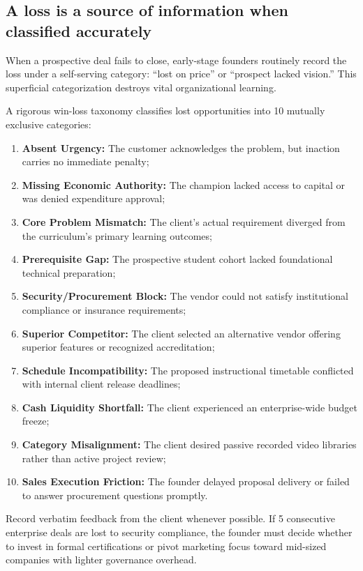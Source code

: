 \subsection{A loss is a source of information when classified accurately}

When a prospective deal fails to close, early-stage founders routinely record the loss under a self-serving category: ``lost on price'' or ``prospect lacked vision.'' This superficial categorization destroys vital organizational learning.

A rigorous win-loss taxonomy classifies lost opportunities into 10 mutually exclusive categories:
\begin{enumerate}
\item \textbf{Absent Urgency:} The customer acknowledges the problem, but inaction carries no immediate penalty;
\item \textbf{Missing Economic Authority:} The champion lacked access to capital or was denied expenditure approval;
\item \textbf{Core Problem Mismatch:} The client's actual requirement diverged from the curriculum's primary learning outcomes;
\item \textbf{Prerequisite Gap:} The prospective student cohort lacked foundational technical preparation;
\item \textbf{Security/Procurement Block:} The vendor could not satisfy institutional compliance or insurance requirements;
\item \textbf{Superior Competitor:} The client selected an alternative vendor offering superior features or recognized accreditation;
\item \textbf{Schedule Incompatibility:} The proposed instructional timetable conflicted with internal client release deadlines;
\item \textbf{Cash Liquidity Shortfall:} The client experienced an enterprise-wide budget freeze;
\item \textbf{Category Misalignment:} The client desired passive recorded video libraries rather than active project review;
\item \textbf{Sales Execution Friction:} The founder delayed proposal delivery or failed to answer procurement questions promptly.
\end{enumerate}
Record verbatim feedback from the client whenever possible. If 5 consecutive enterprise deals are lost to security compliance, the founder must decide whether to invest in formal certifications or pivot marketing focus toward mid-sized companies with lighter governance overhead.
